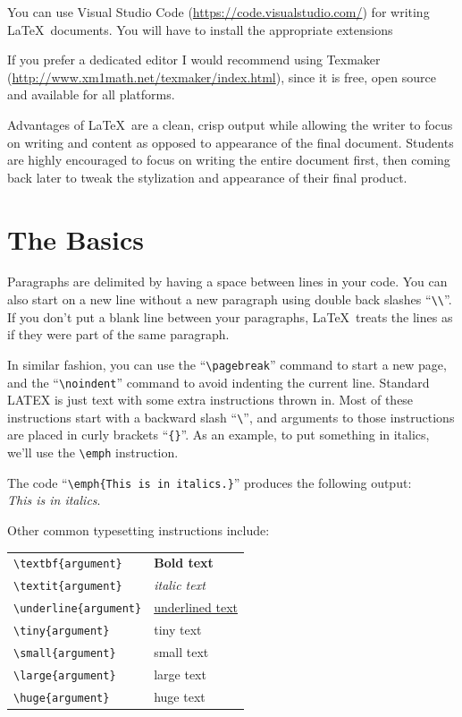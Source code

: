\documentclass[12pt,a4paper]{article} %
\begin{document}
You can use Visual Studio Code (\url{https://code.visualstudio.com/}) for writing \LaTeX\  documents. You will have to install the appropriate extensions

If you prefer a dedicated editor I would recommend using Texmaker (\url{http://www.xm1math.net/texmaker/index.html}), since it is free, open source and available for all platforms.


Advantages of \LaTeX\  are a clean, crisp output while allowing the writer to focus on writing and content as opposed to appearance of the final document. Students are highly encouraged to focus on writing the entire document first, then coming back later to tweak the stylization and appearance of their final product.





\section{The Basics}

Paragraphs are delimited by having a space between lines in your code. You can also start on a new line without a new paragraph using double back slashes “{\verb|\\|}”. If you don’t put a blank line between your paragraphs, \LaTeX\  treats the lines as if they were part of the same paragraph.  

In similar fashion, you can use the “\verb|\pagebreak|” command to start a new page, and the “\verb|\noindent|” command to avoid indenting the current line.
Standard LATEX is just text with some extra instructions thrown in. Most of these instructions start with a backward slash “\verb|\|”, and arguments to those instructions are placed in curly brackets “\verb|{}|”. As an example, to put something in italics, we’ll use the \verb|\emph| instruction.

The code “\verb|\emph{This is in italics.}|” produces the following output: \\
\emph{This is in italics}.


Other common typesetting instructions include:

\begin{tabular}{ll}
\verb|\textbf{argument}| & \textbf{Bold text} \\
\verb|\textit{argument}| &  \textit{italic text} \\
\verb|\underline{argument}| &  \underline{underlined text} \\
\verb|\tiny{argument}| & \tiny{tiny text} \\
\verb|\small{argument}| & \small{small text} \\ 
\verb|\large{argument}| & \large{large text} \\
\verb|\huge{argument}| & \huge{huge text}
\end{tabular}
\end{document}
